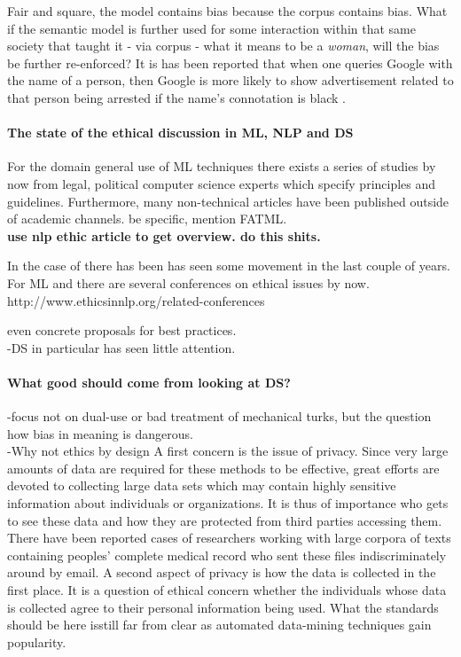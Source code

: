 \documentclass{article}
\begin{document}
Fair and square, the model contains bias because the corpus contains bias. What if the semantic model is further used for some interaction within that same society that taught it - via corpus - what it means to be a \emph{woman}, will the bias be further re-enforced? It is has been reported that when one queries Google with the name of a person, then Google is more likely to show advertisement related to that person being arrested if the name's connotation is black \cite{sweeney2013discrimination}.

\paragraph{The state of the ethical discussion in ML, NLP and DS}
For the domain general use of ML techniques there exists a series of studies by now from legal, political computer science experts which specify principles and guidelines. Furthermore, many non-technical articles have been published outside of academic channels. 
be specific, mention FATML. \\
\textbf{use nlp ethic article to get overview. do this shits.}

In the case of  there has been  has seen some movement in the last couple of years.
For ML and  there are several  conferences on ethical issues by now.
http://www.ethicsinnlp.org/related-conferences

 even concrete proposals for best practices.\\
-DS in particular has seen little attention.

\paragraph{What good should come from looking at DS?}
-focus not on dual-use or bad treatment of mechanical turks, but the question how bias in meaning is dangerous.\\
-Why not ethics by design
A first concern is the issue of privacy. Since very large amounts of data are required for these methods to be effective, great efforts are devoted to collecting large data sets which may contain highly sensitive information about individuals or organizations. It is thus of importance who gets to see these data and how they are protected from third parties accessing them. There have been reported cases of researchers working with large corpora of texts containing peoples' complete medical record who sent these files indiscriminately around by email. A second aspect of privacy is how the data is collected in the first place. It is a question of ethical concern whether the individuals whose data is collected agree to their personal information being used. What the standards should be here isstill  far from clear as automated data-mining techniques gain popularity.
\end{document}
